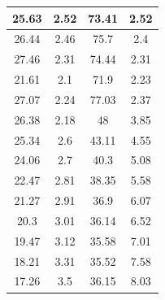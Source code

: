 \documentclass[a4paper, 12pt]{article}%
\begin{document}
\begin{table}[]
\begin{tabular}{|c|c|c|c|}
		25.63                               & 2.52                             & 73.41                              & 2.52                           \\ \hline
		26.44                               & 2.46                             & 75.7                               & 2.4                            \\ \hline
		27.46                               & 2.31                             & 74.44                              & 2.31                           \\ \hline
		21.61                               & 2.1                              & 71.9                               & 2.23                           \\ \hline
		27.07                               & 2.24                             & 77.03                              & 2.37                           \\ \hline
		26.38                               & 2.18                             & 48                                 & 3.85                           \\ \hline
		25.34                               & 2.6                              & 43.11                              & 4.55                           \\ \hline
		24.06                               & 2.7                              & 40.3                               & 5.08                           \\ \hline
		22.47                               & 2.81                             & 38.35                              & 5.58                           \\ \hline
		21.27                               & 2.91                             & 36.9                               & 6.07                           \\ \hline
		20.3                                & 3.01                             & 36.14                              & 6.52                           \\ \hline
		19.47                               & 3.12                             & 35.58                              & 7.01                           \\ \hline
		18.21                               & 3.31                             & 35.52                              & 7.58                           \\ \hline
		17.26                               & 3.5                              & 36.15                              & 8.03                           \\ \hline

\end{tabular}
\end{table}
\end{document}

